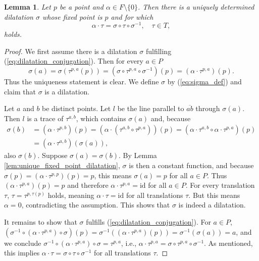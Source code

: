 \documentclass[11pt,a4paper]{article}
\newcommand{\lineab}[1]{\overline{#1}}
\newtheorem{lemma}[theorem]{Lemma}
\begin{document}
\begin{lemma} \label{lem:dilatation_from_endomorphism}
Let $p$ be a point and $\alpha \in F \setminus \{0\}$. Then there is a uniquely determined dilatation $\sigma$ whose fixed point is $p$ and for which
\begin{equation} \label{eq:dilatation_conjugation}
    \alpha \cdot \tau = \sigma \circ \tau \circ \sigma^{-1}, \quad \tau \in T,
\end{equation}
holds.
\end{lemma}

\begin{proof}
We first assume there is a dilatation $\sigma$ fulfilling (\ref{eq:dilatation_conjugation}). Then for every $a \in P$
\begin{equation} \label{eq:sigma_def}
    \sigma(a) = \sigma(\tau^{p,a}(p)) = (\sigma \circ \tau^{p,a} \circ \sigma^{-1})(p) = (\alpha \cdot \tau^{p,a})(p).
\end{equation}
Thus the uniqueness statement is clear. We define $\sigma$ by (\ref{eq:sigma_def}) and claim that $\sigma$ is a dilatation.

Let $a$ and $b$ be distinct points. Let $l$ be the line parallel to $\lineab{ab}$ through $\sigma(a)$. Then $l$ is a trace of $\tau^{a,b}$, which contains $\sigma(a)$ and, because
\begin{align*}
    \sigma(b) &= (\alpha \cdot \tau^{p,b})(p) = (\alpha \cdot (\tau^{a,b} \circ \tau^{p,a}))(p) = (\alpha \cdot \tau^{a,b} \circ \alpha \cdot \tau^{p,a})(p) \\
    &= (\alpha \cdot \tau^{a,b})(\sigma(a)),
\end{align*}
also $\sigma(b)$. Suppose $\sigma(a) = \sigma(b)$. By Lemma \ref{lem:unique_fixed_point_dilatation}, $\sigma$ is then a constant function, and because $\sigma(p) = (\alpha \cdot \tau^{p,p})(p) = p$, this means $\sigma(a) = p$ for all $a \in P$. Thus $(\alpha \cdot \tau^{p,a})(p) = p$ and therefore $\alpha \cdot \tau^{p,a} = \text{id}$ for all $a \in P$. For every translation $\tau$, $\tau = \tau^{p,\tau(p)}$ holds, meaning $\alpha \cdot \tau = \text{id}$ for all translations $\tau$. But this means $\alpha = 0$, contradicting the assumption. This shows that $\sigma$ is indeed a dilatation.

It remains to show that $\sigma$ fulfills (\ref{eq:dilatation_conjugation}). For $a \in P$, $(\sigma^{-1} \circ (\alpha \cdot \tau^{p,a}) \circ \sigma)(p) = \sigma^{-1}((\alpha \cdot \tau^{p,a})(p)) = \sigma^{-1}(\sigma(a)) = a$, and we conclude $\sigma^{-1} \circ (\alpha \cdot \tau^{p,a}) \circ \sigma = \tau^{p,a}$, i.e., $\alpha \cdot \tau^{p,a} = \sigma \circ \tau^{p,a} \circ \sigma^{-1}$. As mentioned, this implies $\alpha \cdot \tau = \sigma \circ \tau \circ \sigma^{-1}$ for all translations $\tau$.
\end{proof}
\end{document}
